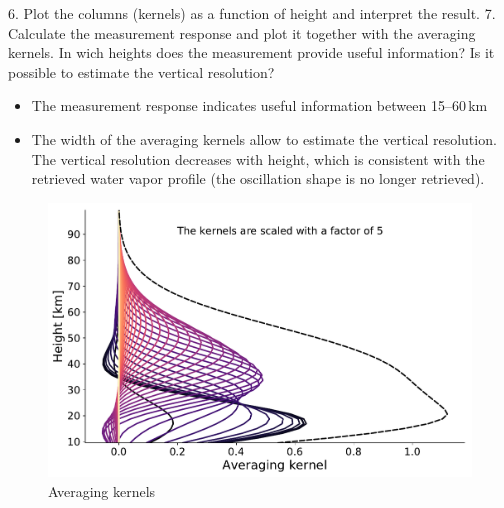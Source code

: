 \documentclass[paper=a4, fontsize=11pt]{scrartcl}
\begin{document}
\newpage

6. Plot the columns (kernels) as a function of height and interpret the result.
7. Calculate the measurement response and plot it together with the averaging
kernels. In wich heights does the measurement provide useful information? Is it
possible to estimate the vertical resolution?
\begin{itemize}
  \item The measurement response indicates useful information between
    15--60\,km
  \item The width of the averaging kernels allow to estimate the vertical
    resolution. The vertical resolution decreases with height,
    which is consistent with the retrieved water vapor profile
    (the oscillation shape is no longer retrieved).
\end{itemize}

\begin{figure}[ht]
  \centering
  \includegraphics[width=\textwidth]{plots/averaging_kernels.pdf}
  \caption{Averaging kernels \label{fig:averaging_kernels}}
\end{figure}
\end{document}

